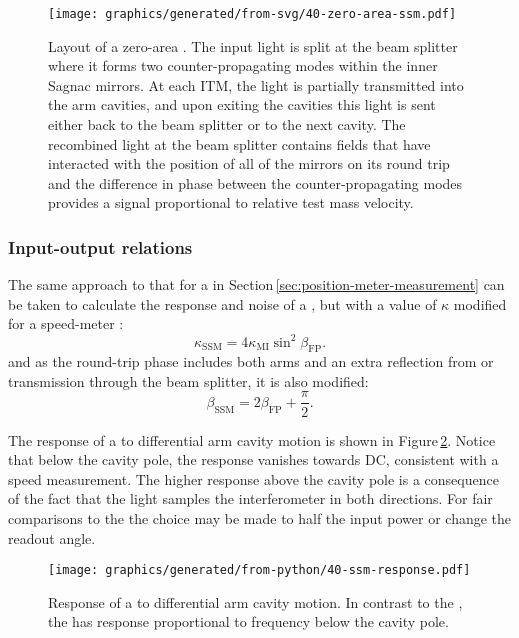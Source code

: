 \begin{figure}
  \centering
  \texttt{[image: graphics/generated/from-svg/40-zero-area-ssm.pdf]}
  \caption[Layout of a zero-area \SSM{}]{\label{fig:zero-area-ssm}Layout of a zero-area \SSM{}. The input light is split at the beam splitter where it forms two counter-propagating modes within the inner Sagnac mirrors. At each \gls{ITM}, the light is partially transmitted into the arm cavities, and upon exiting the cavities this light is sent either back to the beam splitter or to the next cavity. The recombined light at the beam splitter contains fields that have interacted with the position of all of the mirrors on its round trip and the difference in phase between the counter-propagating modes provides a signal proportional to relative test mass velocity.}
\end{figure} 

\subsubsection{Input-output relations}
The same approach to that for a \FPMI{} in Section\,\ref{sec:position-meter-measurement} can be taken to calculate the response and noise of a \SM{}, but with a value of $\kappa$ modified for a speed-meter \cite{Chen2003}:
\begin{equation}
  \kappa_{\text{SSM}} = 4 \kappa_{\text{MI}} \sin^2 \beta_{\text{FP}}.
\end{equation}
and as the round-trip phase includes both arms and an extra reflection from or transmission through the beam splitter, it is also modified:
\begin{equation}
  \beta_{\text{SSM}} = 2 \beta_{\text{FP}} + \frac{\pi}{2}.
\end{equation}

The response of a \SSM{} to differential arm cavity motion is shown in Figure\,\ref{fig:ssm-response}. Notice that below the cavity pole, the response vanishes towards \gls{DC}, consistent with a speed measurement. The higher response above the cavity pole is a consequence of the fact that the light samples the interferometer in both directions. For fair comparisons to the \MI{} the choice may be made to half the input power or change the readout angle.

\begin{figure}
  \centering
  \texttt{[image: graphics/generated/from-python/40-ssm-response.pdf]}
  \caption[Response of a \SSM{} to differential arm cavity motion]{\label{fig:ssm-response}Response of a \SSM{} to differential arm cavity motion. In contrast to the \MI{}, the \SSM{} has response proportional to frequency below the cavity pole.}
\end{figure}

